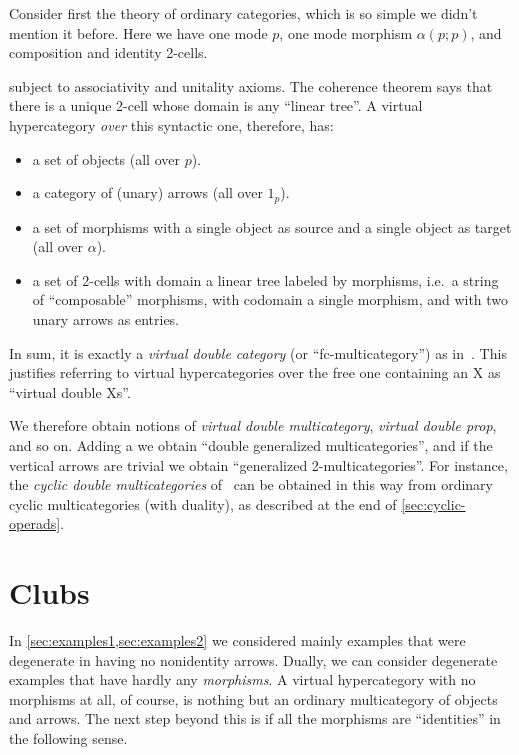 \documentclass{article}
\theoremstyle{definition}
\theoremstyle{remark}
\let\types\vdash
\begin{document}
Consider first the theory of ordinary categories, which is so simple we didn't mention it before.
Here we have one mode $p$, one mode morphism $\alpha(p;p)$, and composition and identity 2-cells.
subject to associativity and unitality axioms.
The coherence theorem says that there is a unique 2-cell whose domain is any ``linear tree''.
A virtual hypercategory \emph{over} this syntactic one, therefore, has:
\begin{itemize}
\item a set of objects (all over $p$).
\item a category of (unary) arrows (all over $1_p$).
\item a set of morphisms with a single object as source and a single object as target (all over $\alpha$).
\item a set of 2-cells with domain a linear tree labeled by morphisms, i.e.\ a string of ``composable'' morphisms, with codomain a single morphism, and with two unary arrows as entries.
\end{itemize}
In sum, it is exactly a \emph{virtual double category} (or ``fc-multicategory'') as in~\cite{leinster:fc-multicategories,cs:multicats}.
This justifies referring to virtual hypercategories over the free one containing an X as ``virtual double Xs''.

We therefore obtain notions of \emph{virtual double multicategory}, \emph{virtual double prop}, and so on.
Adding a  we obtain ``double generalized multicategories'', and if the vertical arrows are trivial we obtain ``generalized 2-multicategories''.
For instance, the \emph{cyclic double multicategories} of~\cite{cgr:cyclic} can be obtained in this way from ordinary cyclic multicategories (with duality), as described at the end of \cref{sec:cyclic-operads}.


\section{Clubs}
\label{sec:clubs}

In \cref{sec:examples1,sec:examples2} we considered mainly examples that were degenerate in having no nonidentity arrows.
Dually, we can consider degenerate examples that have hardly any \emph{morphisms}.
A virtual hypercategory with no morphisms at all, of course, is nothing but an ordinary multicategory of objects and arrows.
The next step beyond this is if all the morphisms are ``identities'' in the following sense.
\end{document}
